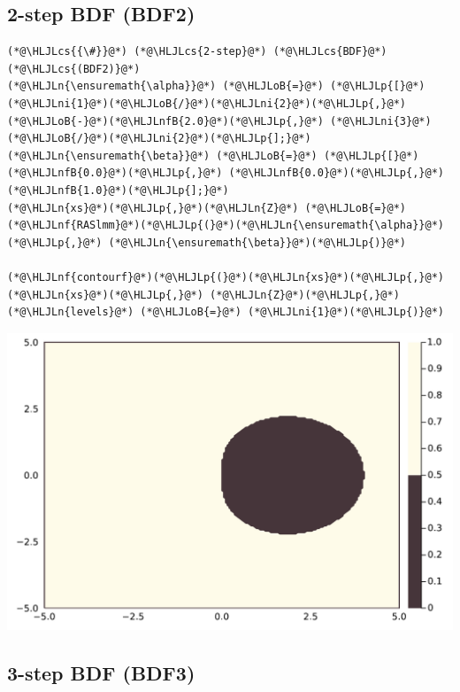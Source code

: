 \documentclass[12pt,a4paper]{article}
\newcommand{\HLJLn}[1]{#1}
\newcommand{\HLJLnf}[1]{\textcolor[RGB]{66,102,213}{#1}}
\newcommand{\HLJLnfB}[1]{\textcolor[RGB]{59,151,46}{#1}}
\newcommand{\HLJLni}[1]{\textcolor[RGB]{59,151,46}{#1}}
\newcommand{\HLJLoB}[1]{\textcolor[RGB]{102,102,102}{\textbf{#1}}}
\newcommand{\HLJLp}[1]{#1}
\newcommand{\HLJLcs}[1]{\textcolor[RGB]{153,153,119}{\textit{#1}}}
\begin{document}
\subsection{2-step BDF (BDF2)}

\begin{lstlisting}
(*@\HLJLcs{{\#}}@*) (*@\HLJLcs{2-step}@*) (*@\HLJLcs{BDF}@*) (*@\HLJLcs{(BDF2)}@*)
(*@\HLJLn{\ensuremath{\alpha}}@*) (*@\HLJLoB{=}@*) (*@\HLJLp{[}@*)(*@\HLJLni{1}@*)(*@\HLJLoB{/}@*)(*@\HLJLni{2}@*)(*@\HLJLp{,}@*) (*@\HLJLoB{-}@*)(*@\HLJLnfB{2.0}@*)(*@\HLJLp{,}@*) (*@\HLJLni{3}@*)(*@\HLJLoB{/}@*)(*@\HLJLni{2}@*)(*@\HLJLp{];}@*) (*@\HLJLn{\ensuremath{\beta}}@*) (*@\HLJLoB{=}@*) (*@\HLJLp{[}@*)(*@\HLJLnfB{0.0}@*)(*@\HLJLp{,}@*) (*@\HLJLnfB{0.0}@*)(*@\HLJLp{,}@*) (*@\HLJLnfB{1.0}@*)(*@\HLJLp{];}@*)
(*@\HLJLn{xs}@*)(*@\HLJLp{,}@*)(*@\HLJLn{Z}@*) (*@\HLJLoB{=}@*) (*@\HLJLnf{RASlmm}@*)(*@\HLJLp{(}@*)(*@\HLJLn{\ensuremath{\alpha}}@*)(*@\HLJLp{,}@*) (*@\HLJLn{\ensuremath{\beta}}@*)(*@\HLJLp{)}@*)

(*@\HLJLnf{contourf}@*)(*@\HLJLp{(}@*)(*@\HLJLn{xs}@*)(*@\HLJLp{,}@*) (*@\HLJLn{xs}@*)(*@\HLJLp{,}@*) (*@\HLJLn{Z}@*)(*@\HLJLp{,}@*) (*@\HLJLn{levels}@*) (*@\HLJLoB{=}@*) (*@\HLJLni{1}@*)(*@\HLJLp{)}@*)
\end{lstlisting}

\includegraphics[width=\linewidth]{figures/ass_4_report_4_1.pdf}

\subsection{3-step BDF (BDF3)}
\end{document}
